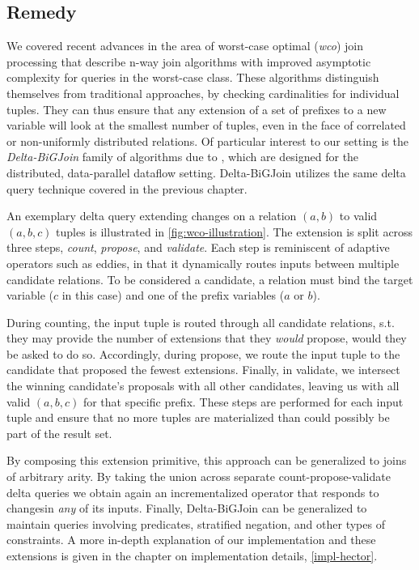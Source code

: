 \documentclass[../catalog.tex]{subfiles}
\begin{document}
\subsection{Remedy}

We covered recent advances in the area of worst-case optimal
(\emph{wco}) join processing that describe n-way join algorithms with
improved asymptotic complexity for queries in the worst-case
class. These algorithms distinguish themselves from traditional
approaches, by checking cardinalities for individual tuples. They can
thus ensure that any extension of a set of prefixes to a new variable
will look at the smallest number of tuples, even in the face of
correlated or non-uniformly distributed relations. Of particular
interest to our setting is the \emph{Delta-BiGJoin} family of
algorithms due to \cite{ammar2018distributed}, which are designed for
the distributed, data-parallel dataflow setting. Delta-BiGJoin
utilizes the same delta query technique covered in the previous
chapter.

An exemplary delta query extending changes on a relation $(a,b)$ to
valid $(a,b,c)$ tuples is illustrated in
\autoref{fig:wco-illustration}. The extension is split across three
steps, \emph{count}, \emph{propose}, and \emph{validate}. Each step is
reminiscent of adaptive operators such as eddies, in that it
dynamically routes inputs between multiple candidate relations. To be
considered a candidate, a relation must bind the target variable ($c$
in this case) and one of the prefix variables ($a$ or $b$).

During counting, the input tuple is routed through all candidate
relations, s.t. they may provide the number of extensions that they
\emph{would} propose, would they be asked to do so. Accordingly,
during propose, we route the input tuple to the candidate that
proposed the fewest extensions. Finally, in validate, we intersect the
winning candidate's proposals with all other candidates, leaving us
with all valid $(a,b,c)$ for that specific prefix. These steps are
performed for each input tuple and ensure that no more tuples are
materialized than could possibly be part of the result set.

By composing this extension primitive, this approach can be
generalized to joins of arbitrary arity. By taking the union across
separate count-propose-validate delta queries we obtain again an
incrementalized operator that responds to changesin \emph{any} of its
inputs. Finally, Delta-BiGJoin can be generalized to maintain queries
involving predicates, stratified negation, and other types of
constraints. A more in-depth explanation of our implementation and
these extensions is given in the chapter on implementation details,
\autoref{impl-hector}.
\end{document}
